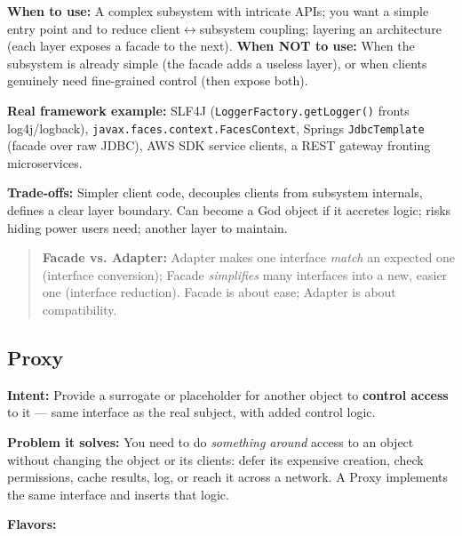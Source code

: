 \documentclass[11pt]{article}
\begin{document}
\textbf{When to use:} A complex subsystem with intricate APIs; you want a simple entry point and to reduce client\(\leftrightarrow\)subsystem coupling; layering an architecture (each layer exposes a facade to the next). \textbf{When NOT to use:} When the subsystem is already simple (the facade adds a useless layer), or when clients genuinely need fine-grained control (then expose both).

\textbf{Real framework example:} SLF4J (\texttt{LoggerFactory.getLogger()} fronts log4j/logback), \texttt{javax.faces.context.FacesContext}, Spring\textquotesingle s \texttt{JdbcTemplate} (facade over raw JDBC), AWS SDK service clients, a REST gateway fronting microservices.

\textbf{Trade-offs:} Simpler client code, decouples clients from subsystem internals, defines a clear layer boundary. Can become a God object if it accretes logic; risks hiding power users need; another layer to maintain.

\begin{quote}
\textbf{Facade vs. Adapter:} Adapter makes one interface \emph{match} an expected one (interface conversion); Facade \emph{simplifies} many interfaces into a new, easier one (interface reduction). Facade is about ease; Adapter is about compatibility.
\end{quote}

\subsection{Proxy}\label{proxy}

\textbf{Intent:} Provide a surrogate or placeholder for another object to \textbf{control access} to it --- same interface as the real subject, with added control logic.

\textbf{Problem it solves:} You need to do \emph{something around} access to an object without changing the object or its clients: defer its expensive creation, check permissions, cache results, log, or reach it across a network. A Proxy implements the same interface and inserts that logic.

\textbf{Flavors:}
\end{document}
